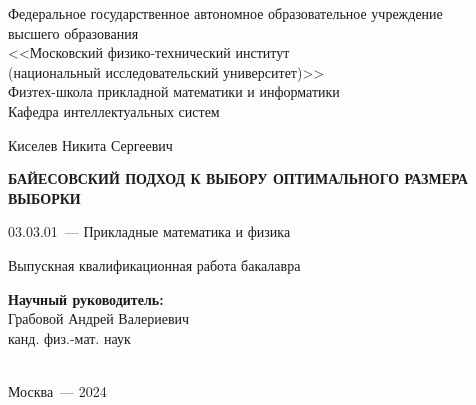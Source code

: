 \thispagestyle{empty}

\begin{titlepage}
%
\begin{center}
Федеральное государственное автономное образовательное учреждение\\ высшего образования\\
<<Московский физико-технический институт\\
(национальный исследовательский университет)>>\\
Физтех-школа прикладной математики и информатики\\
Кафедра интеллектуальных систем
\end{center}
%
\vspace{0pt plus5fill}
%
\begin{center}
\large{Киселев Никита Сергеевич}
\end{center}
%
\vspace{0pt}
%
\begin{center}
\textbf{\large{\MakeUppercase{Байесовский подход к выбору оптимального размера выборки}}}
\end{center}
%
\vspace{0pt}
%
\begin{center}
03.03.01~--- Прикладные математика и физика
\end{center}
%
\vspace{0pt}
%
\begin{center}
Выпускная квалификационная работа бакалавра
\end{center}
%
\vspace{0pt plus2fill}
%
\begin{center}
\hfill\parbox{8,4cm}{\textbf{Научный руководитель:}\\
Грабовой Андрей Валериевич\\
канд. физ.-мат. наук}\\
\vspace{0pt plus4fill}
Москва~--- 2024    
\end{center}
%
\end{titlepage}